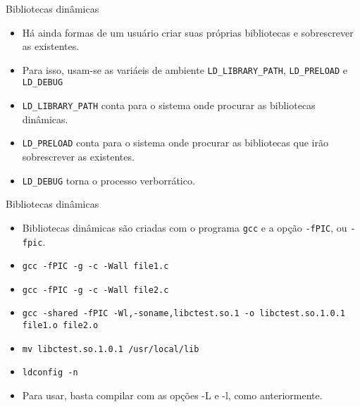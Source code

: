 \begin{frame}{Bibliotecas dinâmicas} 
  \begin{itemize}
   \item Há ainda formas de um usuário criar suas próprias bibliotecas e sobrescrever as existentes.
  \pause
  \item Para isso, usam-se as variáeis de ambiente \texttt{LD\_LIBRARY\_PATH}, \texttt{LD\_PRELOAD} 
        e \texttt{LD\_DEBUG}
  \pause
  \item \texttt{LD\_LIBRARY\_PATH} conta para o sistema onde procurar as bibliotecas dinâmicas.
  \pause
  \item \texttt{LD\_PRELOAD} conta para o sistema onde procurar as bibliotecas que irão sobrescrever as existentes.
  \pause
  \item \texttt{LD\_DEBUG} torna o processo verborrático. 
  \end{itemize}
\end{frame}

\begin{frame}{Bibliotecas dinâmicas} 
  \begin{itemize}
   \item Bibliotecas dinâmicas são criadas com o programa \texttt{gcc} 
         e a opção \texttt{-fPIC}, ou \texttt{-fpic}.
  \pause
  \item \texttt{gcc -fPIC -g -c -Wall file1.c}
  \pause
  \item \texttt{gcc -fPIC -g -c -Wall file2.c}
  \pause
  \item \texttt{gcc -shared -fPIC -Wl,-soname,libctest.so.1 -o libctest.so.1.0.1 file1.o file2.o}
  \pause
  \item \texttt{mv libctest.so.1.0.1 /usr/local/lib}
  \pause
  \item \texttt{ldconfig -n}
  \pause
  \item Para usar, basta compilar com as opções -L e -l, como anteriormente.
  \end{itemize}
\end{frame}


%








